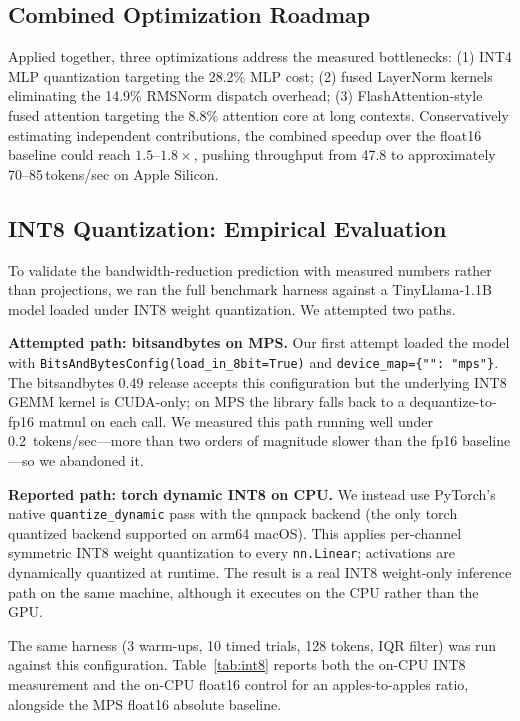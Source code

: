 \documentclass[conference]{IEEEtran}
\begin{document}
\subsection{Combined Optimization Roadmap}

Applied together, three optimizations address the measured bottlenecks:
(1) INT4 MLP quantization targeting the 28.2\% MLP cost; (2) fused
LayerNorm kernels eliminating the 14.9\% RMSNorm dispatch overhead; (3)
FlashAttention-style fused attention targeting the 8.8\% attention core
at long contexts. Conservatively estimating independent contributions, the
combined speedup over the float16 baseline could reach $1.5$--$1.8\times$,
pushing throughput from 47.8 to approximately 70--85\,tokens/sec on Apple
Silicon.

\subsection{INT8 Quantization: Empirical Evaluation}
\label{sec:int8eval}

To validate the bandwidth-reduction prediction with measured numbers
rather than projections, we ran the full benchmark harness against a
TinyLlama-1.1B model loaded under INT8 weight quantization. We
attempted two paths.

\textbf{Attempted path: bitsandbytes on MPS.} Our first attempt loaded
the model with \texttt{BitsAndBytesConfig(load\_in\_8bit=True)} and
\texttt{device\_map=\{"": "mps"\}}. The bitsandbytes 0.49 release
accepts this configuration but the underlying INT8 GEMM kernel is
CUDA-only; on MPS the library falls back to a dequantize-to-fp16
matmul on each call. We measured this path running well under
0.2~tokens/sec---more than two orders of magnitude slower than the
fp16 baseline---so we abandoned it.

\textbf{Reported path: torch dynamic INT8 on CPU.} We instead use
PyTorch's native \texttt{quantize\_dynamic} pass with the qnnpack
backend (the only torch quantized backend supported on arm64 macOS).
This applies per-channel symmetric INT8 weight quantization to every
\texttt{nn.Linear}; activations are dynamically quantized at runtime.
The result is a real INT8 weight-only inference path on the same
machine, although it executes on the CPU rather than the GPU.

The same harness (3 warm-ups, 10 timed trials, 128 tokens, IQR
filter) was run against this configuration. Table~\ref{tab:int8}
reports both the on-CPU INT8 measurement and the on-CPU float16
control for an apples-to-apples ratio, alongside the MPS float16
absolute baseline.
\end{document}
